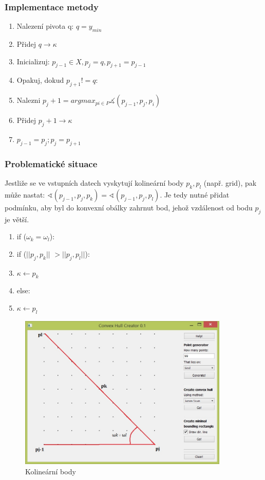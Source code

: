 \documentclass[a4paper, 12pt]{article}
\begin{document}
\subsubsection{Implementace metody}
\begin{enumerate}
\item Nalezení pivota q:  $ q = y_{min} $ 
\item Přidej $ q \longrightarrow \kappa $ 
\item Inicializuj: $p_{j-1} \in X, p_j = q, p_{j+1} = p_{j-1}$
\item Opakuj, dokud $p_{j+1} != q: $
\item 	\hspace {1cm} Nalezni $p_j+1 = argmax_{pi \in P} \measuredangle (p_{j-1}, p_j, p_i)$
\item 	\hspace {1cm} Přidej $p_j+1 \longrightarrow \kappa $
\item 	\hspace {1cm} $p_{j-1} = p_j; p_j = p_{j+1}$
\clearpage
\end{enumerate}

\subsubsection{Problematické situace}
Jestliže se ve vstupních datech vyskytují kolineární body $p_k, p_l$ (např. grid), pak může nastat:  $\sphericalangle (p_{j-1}, p_j, p_k) = \sphericalangle (p_{j-1}, p_j, p_l)$. Je tedy nutné přidat podmínku, aby byl do konvexní obálky zahrnut bod, jehož vzdálenost od bodu $p_j$ je větší.

\begin{enumerate}
\item if ($\omega_k = \omega_l$):
\item \hspace{1cm} if ($||p_j, p_k||$ $>||p_j ,p_l||$):
\item \hspace{2cm} $\kappa \longleftarrow p_k$
\item \hspace{1cm} else:
\item \hspace{2cm} $\kappa \longleftarrow p_l$
\end{enumerate}

\begin{figure}[h]
	\centering
	\includegraphics[width=10cm]{JS.jpg}
	\caption{Kolineární body}
\end{figure}
\clearpage
\end{document}
